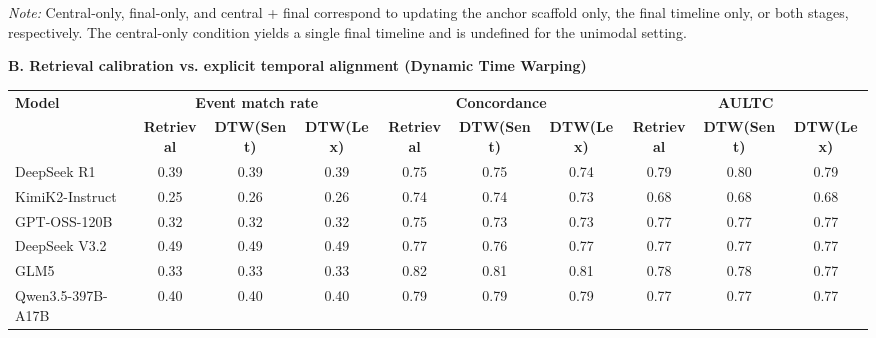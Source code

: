 \begin{table}[h]
{\begin{minipage}{\textwidth}
\vspace{2pt}
\noindent\textit{Note:} Central-only, final-only, and central + final correspond to updating the anchor scaffold only, the final timeline only, or both stages, respectively. The central-only condition yields a single final timeline and is undefined for the unimodal setting.
\vspace{5pt}

\noindent\textbf{B. Retrieval calibration vs. explicit temporal alignment (Dynamic Time Warping)}

\vspace{2pt}
\begin{adjustbox}{max width=\textwidth}
\begin{tabular}{@{}l*{9}{c}@{}}
\hline
\multirow{2}{*}{\textbf{Model}}
& \multicolumn{3}{c}{\textbf{Event match rate}}
& \multicolumn{3}{c}{\textbf{Concordance}}
& \multicolumn{3}{c}{\textbf{AULTC}} \\
\cline{2-4}\cline{5-7}\cline{8-10}
& \textbf{Retrieval}
& \textbf{DTW(Sent)}
& \textbf{DTW(Lex)}
& \textbf{Retrieval}
& \textbf{DTW(Sent)}
& \textbf{DTW(Lex)}
& \textbf{Retrieval}
& \textbf{DTW(Sent)}
& \textbf{DTW(Lex)} \\
\hline
DeepSeek R1
& 0.39 & 0.39 & 0.39
& 0.75 & 0.75 & 0.74
& 0.79 & 0.80 & 0.79 \\

KimiK2-Instruct
& 0.25 & 0.26 & 0.26
& 0.74 & 0.74 & 0.73
& 0.68 & 0.68 & 0.68 \\

GPT-OSS-120B
& 0.32 & 0.32 & 0.32
& 0.75 & 0.73 & 0.73
& 0.77 & 0.77 & 0.77 \\

DeepSeek V3.2
& 0.49 & 0.49 & 0.49
& 0.77 & 0.76 & 0.77
& 0.77 & 0.77 & 0.77 \\

GLM5
& 0.33 & 0.33 & 0.33
& 0.82 & 0.81 & 0.81
& 0.78 & 0.78 & 0.77 \\

Qwen3.5-397B-A17B
& 0.40 & 0.40 & 0.40
& 0.79 & 0.79 & 0.79
& 0.77 & 0.77 & 0.77 \\
\hline
\end{tabular}
\end{adjustbox}

\vspace{2pt}

\end{minipage}
}
\label{tab:ablation_and_DTW}
\vspace{-12pt}
\end{table}